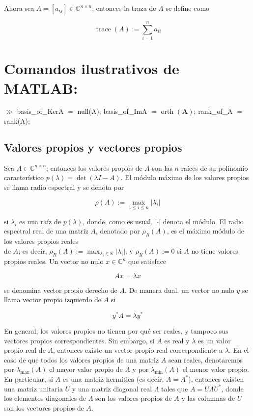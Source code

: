 \documentclass[11pt]{article}
\begin{document}
Ahora sea $A=\left[a_{i j}\right] \in \mathbb{C}^{n \times n}$; entonces la traza de $A$ se define como

$$
\operatorname{trace}(A):=\sum_{i=1}^{n} a_{i i}
$$

\section*{Comandos ilustrativos de MATLAB:}
$\gg$ basis\_of\_KerA $=$ null(A); basis\_of\_ImA $=$ orth $(\mathbf{A})$; rank\_of\_A $=$ rank(A);

\subsection*{Valores propios y vectores propios}
Sea $A \in \mathbb{C}^{n \times n}$; entonces los valores propios de $A$ son las $n$ raíces de su polinomio característico $p(\lambda)=\operatorname{det}(\lambda I-A)$. El módulo máximo de los valores propios se llama radio espectral y se denota por

$$
\rho(A):=\max _{1 \leq i \leq n}\left|\lambda_{i}\right|
$$

si $\lambda_{i}$ es una raíz de $p(\lambda)$, donde, como es usual, $|\cdot|$ denota el módulo. El radio espectral real de una matriz $A$, denotado por $\rho_{R}(A)$, es el máximo módulo de los valores propios reales\\
de $A$; es decir, $\rho_{R}(A):=\max _{\lambda_{i} \in \mathbb{R}}\left|\lambda_{i}\right|$, y $\rho_{R}(A):=0$ si $A$ no tiene valores propios reales. Un vector no nulo $x \in \mathbb{C}^{n}$ que satisface

$$
A x=\lambda x
$$

se denomina vector propio derecho de $A$. De manera dual, un vector no nulo $y$ se llama vector propio izquierdo de $A$ si

$$
y^{*} A=\lambda y^{*}
$$

En general, los valores propios no tienen por qué ser reales, y tampoco sus vectores propios correspondientes. Sin embargo, si $A$ es real y $\lambda$ es un valor propio real de $A$, entonces existe un vector propio real correspondiente a $\lambda$. En el caso de que todos los valores propios de una matriz $A$ sean reales, denotaremos por $\lambda_{\max }(A)$ el mayor valor propio de $A$ y por $\lambda_{\min }(A)$ el menor valor propio. En particular, si $A$ es una matriz hermítica (es decir, $A=A^{*}$), entonces existen una matriz unitaria $U$ y una matriz diagonal real $\Lambda$ tales que $A=U \Lambda U^{*}$, donde los elementos diagonales de $\Lambda$ son los valores propios de $A$ y las columnas de $U$ son los vectores propios de $A$.
\end{document}
